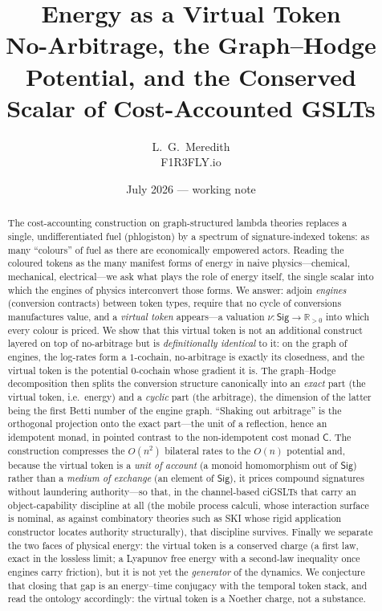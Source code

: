 \documentclass[11pt]{article}
\title{\bfseries Energy as a Virtual Token\\[0.35em]
\large No-Arbitrage, the Graph--Hodge Potential, and the Conserved Scalar of Cost-Accounted GSLTs}
\author{L.~G.~Meredith\\ \small F1R3FLY.io}
\date{July 2026 --- working note}
\theoremstyle{definition}
\theoremstyle{plain}
\theoremstyle{remark}
\newcommand{\Sig}{\mathsf{Sig}}
\newcommand{\Rpos}{\mathbb{R}_{>0}}
\newcommand{\cost}{\mathsf{C}}
\begin{document}
\maketitle

\begin{abstract}
The cost-accounting construction on graph-structured lambda theories replaces a single,
undifferentiated fuel (phlogiston) by a spectrum of signature-indexed tokens: as many
``colours'' of fuel as there are economically empowered actors. Reading the coloured tokens
as the many manifest forms of energy in naive physics---chemical, mechanical, electrical---we
ask what plays the role of energy itself, the single scalar into which the engines of physics
interconvert those forms. We answer: adjoin \emph{engines} (conversion contracts) between token
types, require that no cycle of conversions manufactures value, and a \emph{virtual token}
appears---a valuation $\nu:\Sig\to\Rpos$ into which every colour is priced. We show that this
virtual token is not an additional construct layered on top of no-arbitrage but is
\emph{definitionally identical} to it: on the graph of engines, the log-rates form a $1$-cochain,
no-arbitrage is exactly its closedness, and the virtual token is the potential $0$-cochain whose
gradient it is. The graph--Hodge decomposition then splits the conversion structure canonically
into an \emph{exact} part (the virtual token, i.e.\ energy) and a \emph{cyclic} part (the
arbitrage), the dimension of the latter being the first Betti number of the engine graph.
``Shaking out arbitrage'' is the orthogonal projection onto the exact part---the unit of a
reflection, hence an idempotent monad, in pointed contrast to the non-idempotent cost monad
$\cost$. The construction compresses the $O(n^2)$ bilateral rates to the $O(n)$ potential and,
because the virtual token is a \emph{unit of account} (a monoid homomorphism out of $\Sig$) rather
than a \emph{medium of exchange} (an element of $\Sig$), it prices compound signatures without
laundering authority---so that, in the channel-based ciGSLTs that carry an object-capability
discipline at all (the mobile process calculi, whose interaction surface is nominal, as against
combinatory theories such as SKI whose rigid application constructor locates authority
structurally), that discipline survives. Finally we separate the two
faces of physical energy: the virtual token is a conserved charge (a first law, exact in the
lossless limit; a Lyapunov free energy with a second-law inequality once engines carry friction),
but it is not yet the \emph{generator} of the dynamics. We conjecture that closing that gap is an
energy--time conjugacy with the temporal token stack, and read the ontology accordingly: the
virtual token is a Noether charge, not a substance.
\end{abstract}
\end{document}
